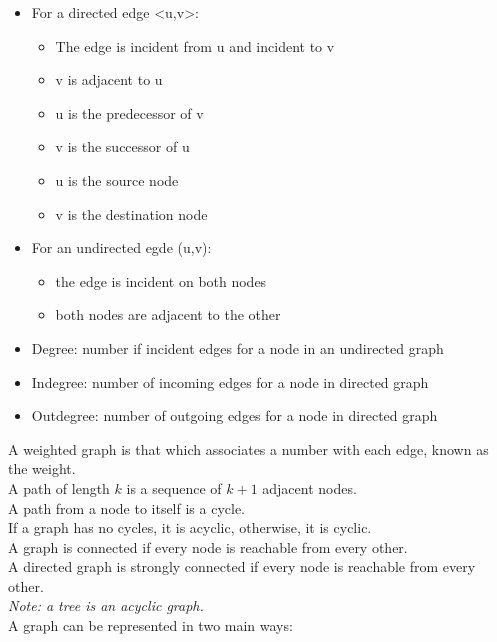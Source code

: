 \documentclass[nobib]{tufte-handout}
\begin{document}
\begin{itemize}
    \item For a directed edge <u,v>:\\
          \begin{itemize}
              \item The edge is incident from u and incident to v
              \item v is adjacent to u
              \item u is the predecessor of v
              \item v is the successor of u
              \item u is the source node
              \item v is the destination node
          \end{itemize}
    \item For an undirected egde (u,v):
          \begin{itemize}
              \item the edge is incident on both nodes
              \item both nodes are adjacent to the other
          \end{itemize}
    \item Degree: number if incident edges for a node in an undirected graph
    \item Indegree: number of incoming edges for a node in directed graph
    \item Outdegree: number of outgoing edges for a node in directed graph
\end{itemize}
A weighted graph is that which associates a number with each edge, known as the weight.\\
A path of length $k$ is a sequence of $k+1$ adjacent nodes.\\
A path from a node to itself is a cycle.\\
If a graph has no cycles, it is acyclic, otherwise, it is cyclic.\\
A graph is connected if every node is reachable from every other.\\
A directed graph is strongly connected if every node is reachable from every other.\\
\textit{Note: a tree is an acyclic graph.}\\
A graph can be represented in two main ways:
\end{document}
